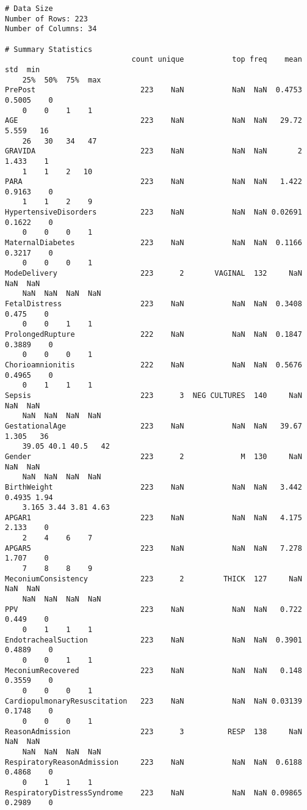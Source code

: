 \documentclass[11pt]{article}
\begin{document}
\begin{Verbatim}[tabsize=4]
# Data Size
Number of Rows: 223
Number of Columns: 34

# Summary Statistics
                             count unique           top freq    mean    std  min
	25%  50%  75%  max
PrePost                        223    NaN           NaN  NaN  0.4753 0.5005    0
	0    0    1    1
AGE                            223    NaN           NaN  NaN   29.72  5.559   16
	26   30   34   47
GRAVIDA                        223    NaN           NaN  NaN       2  1.433    1
	1    1    2   10
PARA                           223    NaN           NaN  NaN   1.422 0.9163    0
	1    1    2    9
HypertensiveDisorders          223    NaN           NaN  NaN 0.02691 0.1622    0
	0    0    0    1
MaternalDiabetes               223    NaN           NaN  NaN  0.1166 0.3217    0
	0    0    0    1
ModeDelivery                   223      2       VAGINAL  132     NaN    NaN  NaN
	NaN  NaN  NaN  NaN
FetalDistress                  223    NaN           NaN  NaN  0.3408  0.475    0
	0    0    1    1
ProlongedRupture               222    NaN           NaN  NaN  0.1847 0.3889    0
	0    0    0    1
Chorioamnionitis               222    NaN           NaN  NaN  0.5676 0.4965    0
	0    1    1    1
Sepsis                         223      3  NEG CULTURES  140     NaN    NaN  NaN
	NaN  NaN  NaN  NaN
GestationalAge                 223    NaN           NaN  NaN   39.67  1.305   36
	39.05 40.1 40.5   42
Gender                         223      2             M  130     NaN    NaN  NaN
	NaN  NaN  NaN  NaN
BirthWeight                    223    NaN           NaN  NaN   3.442 0.4935 1.94
	3.165 3.44 3.81 4.63
APGAR1                         223    NaN           NaN  NaN   4.175  2.133    0
	2    4    6    7
APGAR5                         223    NaN           NaN  NaN   7.278  1.707    0
	7    8    8    9
MeconiumConsistency            223      2         THICK  127     NaN    NaN  NaN
	NaN  NaN  NaN  NaN
PPV                            223    NaN           NaN  NaN   0.722  0.449    0
	0    1    1    1
EndotrachealSuction            223    NaN           NaN  NaN  0.3901 0.4889    0
	0    0    1    1
MeconiumRecovered              223    NaN           NaN  NaN   0.148 0.3559    0
	0    0    0    1
CardiopulmonaryResuscitation   223    NaN           NaN  NaN 0.03139 0.1748    0
	0    0    0    1
ReasonAdmission                223      3          RESP  138     NaN    NaN  NaN
	NaN  NaN  NaN  NaN
RespiratoryReasonAdmission     223    NaN           NaN  NaN  0.6188 0.4868    0
	0    1    1    1
RespiratoryDistressSyndrome    223    NaN           NaN  NaN 0.09865 0.2989    0

\end{Verbatim}
\end{document}
